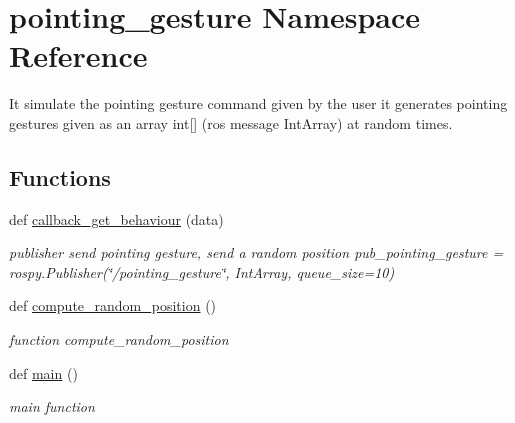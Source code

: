 \hypertarget{namespacepointing__gesture}{}\section{pointing\+\_\+gesture Namespace Reference}
\label{namespacepointing__gesture}


It simulate the pointing gesture command given by the user it generates pointing gestures given as an array int\mbox{[}\mbox{]} (ros message Int\+Array) at random times.  


\subsection*{Functions}
\begin{DoxyCompactItemize}
\item 
def \hyperlink{namespacepointing__gesture_a0ccd291e8028504e94f37e49a5411b3d}{callback\+\_\+get\+\_\+behaviour} (data)
\begin{DoxyCompactList}\small\item\em publisher send pointing gesture, send a random position pub\+\_\+pointing\+\_\+gesture = rospy.\+Publisher(\char`\"{}/pointing\+\_\+gesture\char`\"{}, Int\+Array, queue\+\_\+size=10) \end{DoxyCompactList}\item 
def \hyperlink{namespacepointing__gesture_a3f243853d60010878f1a2dbbe2338dbd}{compute\+\_\+random\+\_\+position} ()
\begin{DoxyCompactList}\small\item\em function compute\+\_\+random\+\_\+position \end{DoxyCompactList}\item 
def \hyperlink{namespacepointing__gesture_a0246e9d31b3d0b62a01bdb5b697df181}{main} ()
\begin{DoxyCompactList}\small\item\em main function \end{DoxyCompactList}\end{DoxyCompactItemize}
